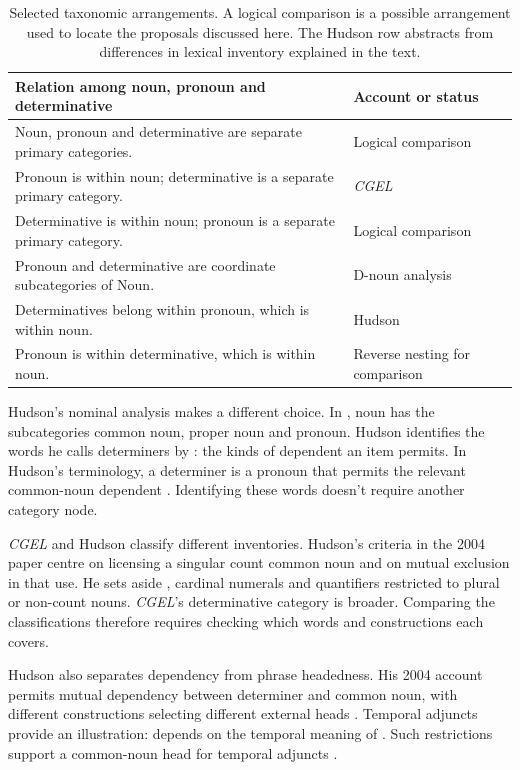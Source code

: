 \documentclass[12pt]{article}
\begin{document}
\begin{table}[tb]
\centering\small
\caption{Selected taxonomic arrangements. A logical comparison is a possible arrangement used to locate the proposals discussed here. The Hudson row abstracts from differences in lexical inventory explained in the text.}\label{tab:rivals}
\begin{tabular}{>{\raggedright\arraybackslash}p{8.7cm}>{\raggedright\arraybackslash}p{3cm}}
\toprule
Relation among noun, pronoun and determinative & Account or status \\
\midrule
Noun, pronoun and determinative are separate primary categories. & Logical comparison \\
Pronoun is within noun; determinative is a separate primary category. & \textit{CGEL} \\
Determinative is within noun; pronoun is a separate primary category. & Logical comparison \\
Pronoun and determinative are coordinate subcategories of Noun. & D-noun analysis \\
Determinatives belong within pronoun, which is within noun. & Hudson \\
Pronoun is within determinative, which is within noun. & Reverse nesting for comparison \\
\bottomrule
\end{tabular}
\end{table}

Hudson's nominal analysis makes a different choice. In \textcite[253--254]{hudson2010wordgrammar}, noun has the subcategories common noun, proper noun and pronoun. Hudson identifies the words he calls determiners by : the kinds of dependent an item permits. In Hudson's terminology, a determiner is a pronoun that permits the relevant common-noun dependent \citep[9--10]{hudson2004determiners}. Identifying these words doesn't require another category node.

\textit{CGEL} and Hudson classify different inventories. Hudson's criteria in the 2004 paper centre on licensing a singular count common noun and on mutual exclusion in that use. He sets aside , cardinal numerals and quantifiers restricted to plural or non-count nouns. \textit{CGEL}'s determinative category is broader. Comparing the classifications therefore requires checking which words and constructions each covers.

Hudson also separates dependency from phrase headedness. His 2004 account permits mutual dependency between determiner and common noun, with different constructions selecting different external heads \citep[7--9]{hudson2004determiners}. Temporal adjuncts provide an illustration:  depends on the temporal meaning of . Such restrictions support a common-noun head for temporal adjuncts \citep[10--12]{hudson2004determiners}.
\end{document}
